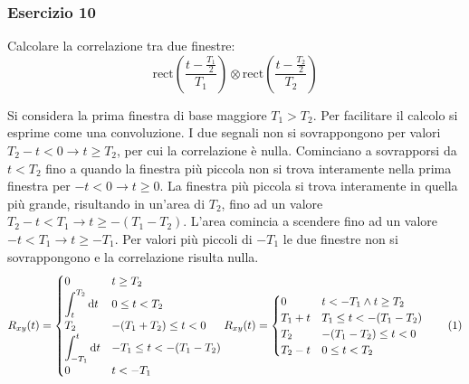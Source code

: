 \documentclass{article}
\newcommand{\rect}{\mathrm{rect}}
\newcommand{\df}{\mathrm{d}}
\newcommand{\tageq}{\tag{\stepcounter{equation}\theequation}}
\begin{document}
\subsubsection*{Esercizio 10}

Calcolare la correlazione tra due finestre:
\begin{equation*}
    \rect\displaystyle\left(\frac{t-\frac{T_1}{2}}{T_1}\right)\otimes\rect\left(\frac{t-\frac{T_2}{2}}{T_2}\right)
\end{equation*}

Si considera la prima finestra di base maggiore $T_1>T_2$. Per facilitare il calcolo si esprime come una convoluzione. I due segnali non si sovrappongono per valori 
$T_2-t<0\to t\geq T_2$, per cui la correlazione è nulla. Cominciano a sovrapporsi da $t<T_2$ fino a quando la finestra più piccola non si trova interamente nella prima 
finestra per $-t<0\to t\geq0$. La finestra più piccola si trova interamente in quella più grande, risultando in un'area di $T_2$, fino ad un valore 
$T_2-t<T_1\to t\geq -(T_1-T_2)$. L'area comincia a scendere fino ad un valore $-t<T_1\to t\geq -T_1$. Per valori più piccoli di $-T_1$ le due finestre non si sovrappongono e la 
correlazione risulta nulla.
\begin{equation*}
    R_{xy}(t)=\begin{cases}
        0&t\geq T_2\\
        \displaystyle\int_t^{T_2}\df t& 0\leq t<T_2\\
        T_2& -(T_1+T_2)\leq t<0\\
        \displaystyle\int_{-T_1}^t\df t& -T_1\leq t<-(T_1-T_2)\\
        0&t<-T_1
    \end{cases}\\
    R_{xy}(t)=\begin{cases}
        0& t<-T_1\land t\geq T_2\\
        T_1+t& T_1\leq t<-(T_1-T_2)\\
        T_2& -(T_1-T_2)\leq t<0\\
        T_2-t &  0\leq t<T_2
    \end{cases}\tageq
\end{equation*}
\end{document}
